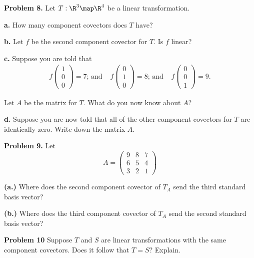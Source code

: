\documentclass[oneside,12pt]{amsart}
\begin{document}
\bigskip

\textbf{Problem 8.} Let $T:\R^3\map\R^4$ be a linear transformation.

\smallskip

\textbf{a.} How many component covectors does $T$ have?

\bigskip

\textbf{b.} Let $f$ be the second component covector for $T$. Is $f$ linear?

\bigskip

\textbf{c.} Suppose you are told that
$$
\begin{matrix}
f \begin{pmatrix} 1 \\ 0 \\ 0 \end{pmatrix} = 7 \text{; and }
&
f \begin{pmatrix} 0 \\ 1 \\ 0 \end{pmatrix} = 8 \text{; and }
&
f \begin{pmatrix} 0 \\ 0 \\ 1 \end{pmatrix} = 9 \text{.}
\end{matrix}
$$

Let $A$ be the matrix for $T$. What do you now know about $A$?

\bigskip
\bigskip
\bigskip

\textbf{d.} Suppose you are now told that all of the other component covectors
for $T$ are identically zero. Write down the matrix $A$.

\bigskip
\bigskip
\bigskip
\bigskip
\bigskip
\bigskip

\textbf{Problem 9.}  Let
$$
A = \begin{pmatrix}
9 & 8 & 7 \\
6 & 5 & 4 \\
3 & 2 & 1
\end{pmatrix}
$$


\textbf{(a.)} Where does the second component covector of $T_A$ send the
third standard basis vector?

\bigskip

\textbf{(b.)} Where does the third component covector of $T_A$ send the
second standard basis vector?

\bigskip

\textbf{Problem 10} Suppose $T$ and $S$ are linear transformations with
the same component covectors. Does it follow that $T = S$? Explain.
\end{document}
